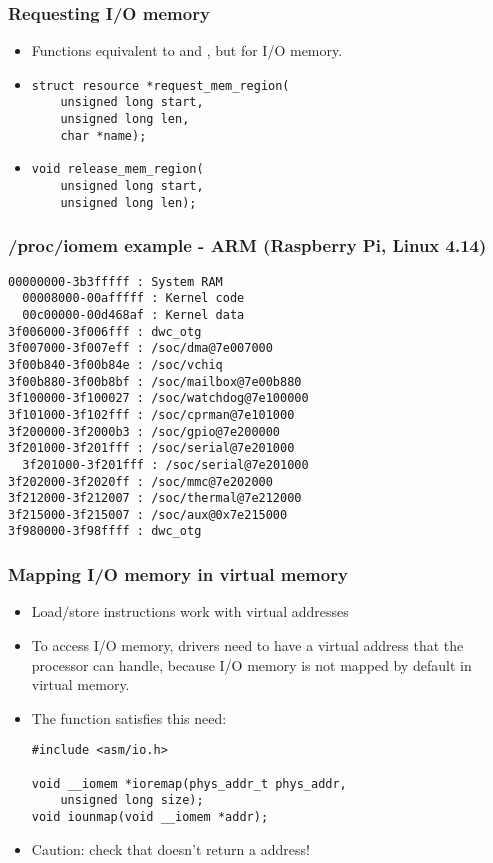 \begin{frame}[fragile]
  \frametitle{Requesting I/O memory}
  \begin{itemize}
  \item Functions equivalent to  and
    , but for I/O memory.
  \item
\begin{verbatim}
struct resource *request_mem_region(
    unsigned long start,
    unsigned long len,
    char *name);
\end{verbatim}
  \item
\begin{verbatim}
void release_mem_region(
    unsigned long start,
    unsigned long len);
  \end{verbatim}
\end{itemize}
\end{frame}

\begin{frame}[fragile]
  \frametitle{/proc/iomem example - ARM (Raspberry Pi, Linux 4.14)}
{\small
\begin{verbatim}
00000000-3b3fffff : System RAM
  00008000-00afffff : Kernel code
  00c00000-00d468af : Kernel data
3f006000-3f006fff : dwc_otg
3f007000-3f007eff : /soc/dma@7e007000
3f00b840-3f00b84e : /soc/vchiq
3f00b880-3f00b8bf : /soc/mailbox@7e00b880
3f100000-3f100027 : /soc/watchdog@7e100000
3f101000-3f102fff : /soc/cprman@7e101000
3f200000-3f2000b3 : /soc/gpio@7e200000
3f201000-3f201fff : /soc/serial@7e201000
  3f201000-3f201fff : /soc/serial@7e201000
3f202000-3f2020ff : /soc/mmc@7e202000
3f212000-3f212007 : /soc/thermal@7e212000
3f215000-3f215007 : /soc/aux@0x7e215000
3f980000-3f98ffff : dwc_otg
\end{verbatim}
}
\end{frame}

\begin{frame}[fragile]
  \frametitle{Mapping I/O memory in virtual memory}
  \begin{itemize}
  \item Load/store instructions work with virtual addresses
  \item To access I/O memory, drivers need to have a virtual address
    that the processor can handle, because I/O memory is not mapped by
    default in virtual memory.
  \item The  function satisfies this need:
\begin{verbatim}
#include <asm/io.h>

void __iomem *ioremap(phys_addr_t phys_addr,
    unsigned long size);
void iounmap(void __iomem *addr);
\end{verbatim}
  \item Caution: check that  doesn't return a  address!
  \end{itemize}
\end{frame}

